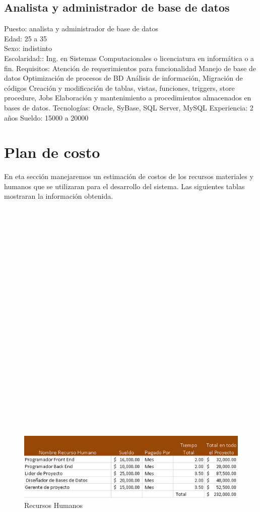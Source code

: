 \documentclass[12pt,letterpaper]{article}
\begin{document}
\subsection*{Analista y administrador de base de datos}
Puesto: analista y administrador de base de datos\\
Edad: 25 a 35\\
Sexo: indistinto\\
Escolaridad:: Ing. en Sistemas Computacionales o licenciatura en informática o a fin.
Requisitos: Atención de requerimientos para funcionalidad
Manejo de base de datos Optimización de procesos de BD Análisis de información,
Migración de códigos Creación y modificación de tablas, vistas, funciones, triggers, store procedure, Jobs
Elaboración y mantenimiento a procedimientos almacenados en bases de datos.
Tecnologías: Oracle, SyBase, SQL Server, MySQL
Experiencia:  2 años 
Sueldo: 15000 a 20000

\section{Plan de costo}
En eta sección manejaremos un estimación de costos de los recursos materiales y humanos que se utilizaran para el desarrollo del sistema. Las siguientes tablas mostraran la información obtenida.\\\\  \\\\\\\\ \\\\\\\\\\\\\\\\\\\\\\\\\\\\\\\\\\\
\begin{figure}
   \centering
   \includegraphics[scale=1.00]{tabla1.png}
   \caption{Recursos Humanos}
   \label{fig:my_label}
\end{figure}
\end{document}
